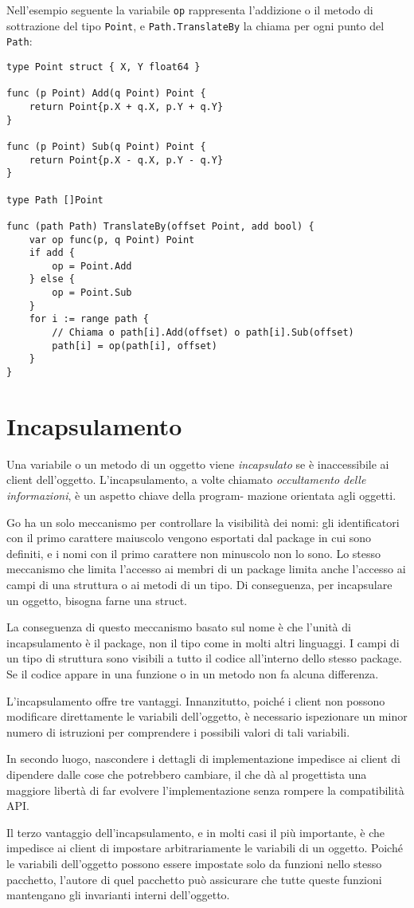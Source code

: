Nell'esempio seguente la variabile \verb|op| rappresenta l'addizione o il metodo di sottrazione del tipo \verb|Point|, e \verb|Path.TranslateBy| la chiama per ogni punto del \verb|Path|:
\begin{lstlisting}[frame=single, label={lst:lstlisting5-4.5}]
type Point struct { X, Y float64 }

func (p Point) Add(q Point) Point {
    return Point{p.X + q.X, p.Y + q.Y}
}

func (p Point) Sub(q Point) Point {
    return Point{p.X - q.X, p.Y - q.Y}
}

type Path []Point

func (path Path) TranslateBy(offset Point, add bool) {
    var op func(p, q Point) Point
    if add {
        op = Point.Add
    } else {
        op = Point.Sub
    }
    for i := range path {
        // Chiama o path[i].Add(offset) o path[i].Sub(offset)
        path[i] = op(path[i], offset)
    }
}
\end{lstlisting}


\section{Incapsulamento}
\label{sec:incapsulamento}%
Una variabile o un metodo di un oggetto viene \textit{incapsulato} se è inaccessibile ai client dell'oggetto.
L'incapsulamento, a volte chiamato \textit{occultamento delle informazioni}, è un aspetto chiave della program- mazione orientata agli oggetti.

Go ha un solo meccanismo per controllare la visibilità dei nomi: gli identificatori con il primo carattere maiuscolo vengono esportati dal package in cui sono definiti, e i nomi con il primo carattere non minuscolo non lo sono.
Lo stesso meccanismo che limita l'accesso ai membri di un package limita anche l'accesso ai campi di una struttura o ai metodi di un tipo.
Di conseguenza, per incapsulare un oggetto, bisogna farne una struct.

La conseguenza di questo meccanismo basato sul nome è che l'unità di incapsulamento è il package, non il tipo come in molti altri linguaggi.
I campi di un tipo di struttura sono visibili a tutto il codice all'interno dello stesso package.
Se il codice appare in una funzione o in un metodo non fa alcuna differenza.

L'incapsulamento offre tre vantaggi.
Innanzitutto, poiché i client non possono modificare direttamente le variabili dell'oggetto, è necessario ispezionare un minor numero di istruzioni per comprendere i possibili valori di tali variabili.

In secondo luogo, nascondere i dettagli di implementazione impedisce ai client di dipendere dalle cose che potrebbero cambiare, il che dà al progettista una maggiore libertà di far evolvere l'implementazione senza rompere la compatibilità API\@.

Il terzo vantaggio dell'incapsulamento, e in molti casi il più importante, è che impedisce ai client di impostare arbitrariamente le variabili di un oggetto.
Poiché le variabili dell'oggetto possono essere impostate solo da funzioni nello stesso pacchetto, l'autore di quel pacchetto può assicurare che tutte queste funzioni mantengano gli invarianti interni dell'oggetto.